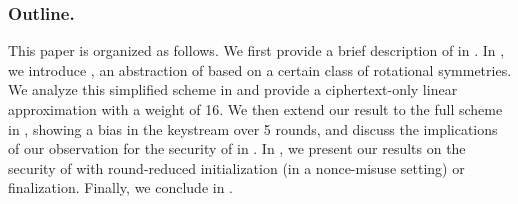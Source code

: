 \subsubsection*{Outline.}
This paper is organized as follows.
We first provide a brief description of \morus in .
In , we introduce \minimorus, an abstraction of \morus based on a certain class of rotational symmetries.
We analyze this simplified scheme in  and provide a ciphertext-only linear approximation with a weight of 16.
We then extend our result to the full scheme in , showing a bias in the keystream over 5 rounds,
and discuss the implications of our observation for the security of \morus in .
In , we present our results on the security of \morus with round-reduced initialization (in a nonce-misuse setting) or finalization.
Finally, we conclude in .
